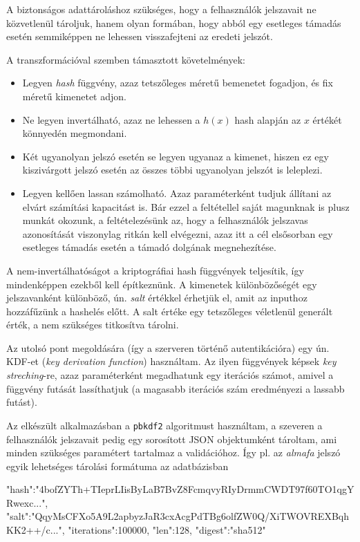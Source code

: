 \begin{itemize}
A biztonságos adattároláshoz szükséges, hogy a felhasználók jelszavait ne
közvetlenül tároljuk, hanem olyan formában, hogy abból egy esetleges támadás
esetén semmiképpen ne lehessen visszafejteni az eredeti jelszót.

A transzformációval szemben támasztott követelmények:

\begin{itemize}
  \item Legyen \emph{hash} függvény, azaz tetszőleges méretű bemenetet fogadjon,
    és fix méretű kimenetet adjon.
  \item Ne legyen invertálható, azaz ne lehessen a $h(x)$ hash alapján az $x$
    értékét könnyedén megmondani.
  \item Két ugyanolyan jelszó esetén se legyen ugyanaz a kimenet, hiszen ez egy
    kiszivárgott jelszó esetén az összes többi ugyanolyan jelszót is leleplezi.
  \item Legyen kellően lassan számolható. Azaz paraméterként tudjuk állítani az
    elvárt számítási kapacitást is. Bár ezzel a feltétellel saját magunknak is
    plusz munkát okozunk, a feltételezésünk az, hogy a felhasználók jelszavas
    azonosítását viszonylag ritkán kell elvégezni, azaz itt a cél elsősorban egy
    esetleges támadás esetén a támadó dolgának megnehezítése.
\end{itemize}

A nem-invertálhatóságot a kriptográfiai hash függvények teljesítik, így
mindenképpen ezekből kell építkeznünk. A kimenetek különbözőségét egy
jelszavanként különböző, ún. \emph{salt} értékkel érhetjük el, amit az inputhoz
hozzáfűzünk a hashelés előtt. A salt értéke egy tetszőleges véletlenül generált
érték, a nem szükséges titkosítva tárolni.

Az utolsó pont megoldására (így a szerveren történő autentikációra) egy ún.
KDF-et (\emph{key derivation function}) használtam. Az ilyen függvények képsek
\emph{key streching}-re, azaz paraméterként megadhatunk egy iterációs számot,
amivel a függvény futását lassíthatjuk (a magasabb iterációs szám eredményezi a
lassabb futást).

Az elkészült alkalmazásban a \texttt{pbkdf2} algoritmust használtam,
a szeveren a felhasználók jelszavait pedig egy sorosított JSON objektumként tároltam,
ami minden szükséges paramétert tartalmaz a validációhoz. Így pl. az
\emph{almafa} jelszó egyik lehetséges tárolási formátuma az adatbázisban

\begin{js}
{
  "hash":"4bofZYTh+TIeprLIisByLaB7BvZ8FcmqvyRIyDrmmCWDT97f60TO1qgYRwexc...",
  "salt":"QqyMsCFXo5A9L2apbyzJaR3cxAcgPdTBg6olfZW0Q/XiTWOVREXBqhKK2++/c...",
  "iterations":100000,
  "len":128,
  "digest":"sha512"
}
\end{js}


\end{itemize}
